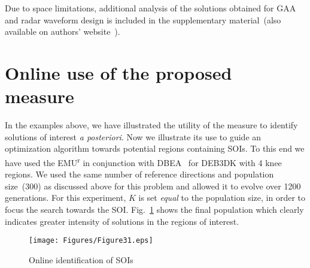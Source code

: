 Due to space limitations, additional analysis of the solutions obtained for GAA and radar waveform design is included in the supplementary material~(also available on authors' website~\cite{benchmark}).
\section{Online use of the proposed measure}
In the examples above, we have illustrated the utility of the measure to identify solutions of interest \textit{a posteriori}. Now we illustrate its use to guide an optimization algorithm towards potential regions containing SOIs. To this end we have used the EMU\textsuperscript{r} in conjunction with DBEA~\cite{asafuddoula2014decomposition} for DEB3DK with 4 knee regions. We used the same number of reference directions and population size~(300) as discussed above for this problem and allowed it to evolve over 1200 generations. For this experiment, $K$ is set \emph{equal} to the population size, in order to focus the search towards the SOI. Fig.~\ref{fig:deb3dk4dbea} shows the final population which clearly indicates greater intensity of solutions in the regions of interest. 

\begin{figure}[!htb]
	\centering    
	\texttt{[image: Figures/Figure31.eps]} 
	\caption{Online identification of SOIs}
	\label{fig:deb3dk4dbea}
\end{figure}

